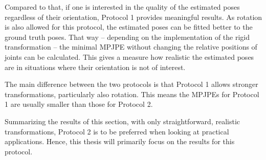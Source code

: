 Compared to that, if one is interested in the quality of the estimated poses regardless of their orientation, Protocol 1 provides meaningful results.
As rotation is also allowed for this protocol, the estimated poses can be fitted better to the ground truth poses.
That way -- depending on the implementation of the rigid transformation -- the minimal MPJPE without changing the relative positions of joints can be calculated.
This gives a measure how realistic the estimated poses are in situations where their orientation is not of interest.

The main difference between the two protocols is that Protocol 1 allows stronger transformations, particularly also rotation.
This means the MPJPEs for Protocol 1 are usually smaller than those for Protocol 2.


Summarizing the results of this section, with only straightforward, realistic transformations, Protocol 2 is to be preferred when looking at practical applications.
Hence, this thesis will primarily focus on the results for this protocol.